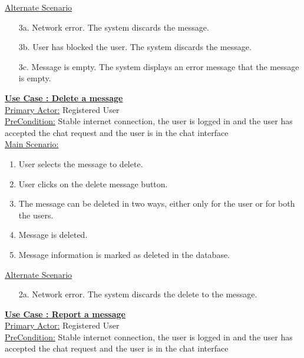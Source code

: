 \documentclass[conference,compsoc]{IEEEtran}
\newcounter{UC}
\newcommand{\nextU}{\stepcounter{UC}\theUC}
\begin{document}
\underline{Alternate Scenario}
\begin{enumerate}
    \item [3a.] Network error. The system discards the message.
    \item [3b.] User has blocked the user. The system discards the message.
    \item [3c.] Message is empty. The system displays an error message that the message is empty.
\end{enumerate}

\underline{\textbf{Use Case \nextU: Delete a message}}\\

\underline{Primary Actor:} Registered User\\

\underline{PreCondition:} Stable internet connection, the user is logged in and the user has accepted the chat request and the user is in the chat interface\\

\underline{Main Scenario:}\\
\begin{enumerate}
    \item User selects the message to delete.
    \item User clicks on the delete message button.
    \item The message can be deleted in two ways, either only for the user or for both the users.
    \item Message is deleted.
    \item Message information is marked as deleted in the database.
\end{enumerate}

\underline{Alternate Scenario}

\begin{enumerate}
    \item [2a.] Network error. The system discards the delete to the message.
\end{enumerate}

\underline{\textbf{Use Case \nextU: Report a message}}\\

\underline{Primary Actor:} Registered User\\

\underline{PreCondition:} Stable internet connection, the user is logged in and the user has accepted the chat request and the user is in the chat interface\\
\end{document}
